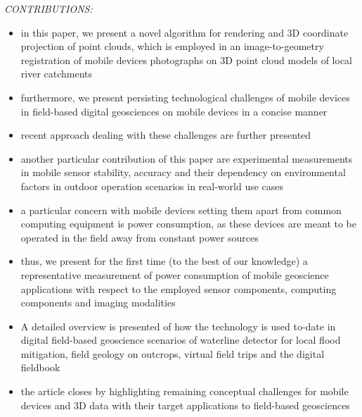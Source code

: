 \documentclass[review]{elsarticle}
\begin{document}
\textit{CONTRIBUTIONS:}
\begin{itemize}
\item in this paper, we present a novel algorithm for rendering and 3D coordinate projection of point clouds, which is employed in an image-to-geometry registration of mobile devices photographs on 3D point cloud models of local river catchments
\item furthermore, we present persisting technological challenges of mobile devices in field-based digital geosciences on mobile devices in a concise manner
\item recent approach dealing with these challenges are further presented
\item another particular contribution of this paper are experimental measurements in mobile sensor stability, accuracy and their dependency on environmental factors in outdoor operation scenarios in real-world use cases
\item a particular concern with mobile devices setting them apart from common computing equipment is power consumption, as these devices are meant to be operated in the field away from constant power sources
\item thus, we present for the first time (to the best of our knowledge) a representative measurement of power consumption of mobile geoscience applications with respect to the employed sensor components, computing components and imaging modalities
\item A detailed overview is presented of how the technology is used to-date in digital field-based geoscience scenarios of waterline detector for local flood mitigation, field geology on outcrops, virtual field trips and the digital fieldbook
\item the article closes by highlighting remaining conceptual challenges for mobile devices and 3D data with their target applications to field-based geosciences
\end{itemize}
\end{document}
